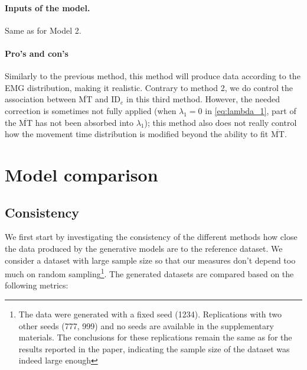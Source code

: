 \documentclass[manuscript,review,anonymous]{acmart}
\newcommand{\mmt}{\ensuremath{\overline{\text{MT}}}\xspace}
\newcommand{\ide}{\ensuremath{{\text{ID}_e}}\xspace}
\begin{document}
\paragraph{Inputs of the model.} Same as for Model 2.

\paragraph{Pro's and con's} Similarly to the previous method, this method will produce data according to the EMG distribution, making it realistic. Contrary to method 2, we do control the association between \mmt and \ide in this third method. However, the needed correction is sometimes not fully applied (when $\lambda_1 = 0$ in \autoref{eq:lambda_1}, part of the \mmt has not been absorbed into $\lambda_1$); this method also does not really control how the movement time distribution is modified beyond the ability to fit \mmt.







\section{Model comparison}

\subsection{Consistency \label{subs:consistency}}
We first start by investigating the consistency of the different methods \ie how close the data produced by the generative models are to the reference dataset. We consider a dataset with large sample size so that our measures don't depend too much on random sampling\footnote{The data were generated with a fixed seed (1234). Replications with two other seeds (777, 999) and no seeds are available in the supplementary materials. The conclusions for these replications remain the same as for the results reported in the paper, indicating the sample size of the dataset was indeed large enough}.
The generated datasets are compared based on the following metrics:
\end{document}
